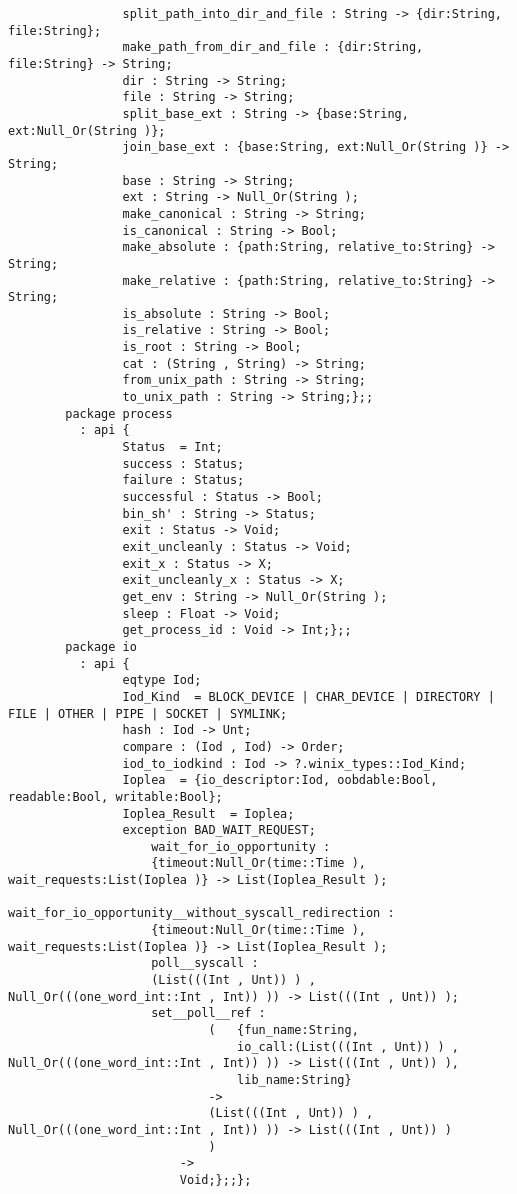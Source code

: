 \begin{verbatim}
                split_path_into_dir_and_file : String -> {dir:String, file:String};
                make_path_from_dir_and_file : {dir:String, file:String} -> String;
                dir : String -> String;
                file : String -> String;
                split_base_ext : String -> {base:String, ext:Null_Or(String )};
                join_base_ext : {base:String, ext:Null_Or(String )} -> String;
                base : String -> String;
                ext : String -> Null_Or(String );
                make_canonical : String -> String;
                is_canonical : String -> Bool;
                make_absolute : {path:String, relative_to:String} -> String;
                make_relative : {path:String, relative_to:String} -> String;
                is_absolute : String -> Bool;
                is_relative : String -> Bool;
                is_root : String -> Bool;
                cat : (String , String) -> String;
                from_unix_path : String -> String;
                to_unix_path : String -> String;};;
        package process
          : api {
                Status  = Int;
                success : Status;
                failure : Status;
                successful : Status -> Bool;
                bin_sh' : String -> Status;
                exit : Status -> Void;
                exit_uncleanly : Status -> Void;
                exit_x : Status -> X;
                exit_uncleanly_x : Status -> X;
                get_env : String -> Null_Or(String );
                sleep : Float -> Void;
                get_process_id : Void -> Int;};;
        package io
          : api {
                eqtype Iod;
                Iod_Kind  = BLOCK_DEVICE | CHAR_DEVICE | DIRECTORY | FILE | OTHER | PIPE | SOCKET | SYMLINK;
                hash : Iod -> Unt;
                compare : (Iod , Iod) -> Order;
                iod_to_iodkind : Iod -> ?.winix_types::Iod_Kind;
                Ioplea  = {io_descriptor:Iod, oobdable:Bool, readable:Bool, writable:Bool};
                Ioplea_Result  = Ioplea;
                exception BAD_WAIT_REQUEST;
                    wait_for_io_opportunity :
                    {timeout:Null_Or(time::Time ), wait_requests:List(Ioplea )} -> List(Ioplea_Result );
                    wait_for_io_opportunity__without_syscall_redirection :
                    {timeout:Null_Or(time::Time ), wait_requests:List(Ioplea )} -> List(Ioplea_Result );
                    poll__syscall :
                    (List(((Int , Unt)) ) , Null_Or(((one_word_int::Int , Int)) )) -> List(((Int , Unt)) );
                    set__poll__ref :
                            (   {fun_name:String,
                                io_call:(List(((Int , Unt)) ) , Null_Or(((one_word_int::Int , Int)) )) -> List(((Int , Unt)) ),
                                lib_name:String}
                            ->
                            (List(((Int , Unt)) ) , Null_Or(((one_word_int::Int , Int)) )) -> List(((Int , Unt)) )
                            )
                        ->
                        Void;};;};
\end{verbatim}
